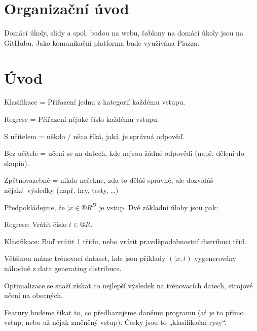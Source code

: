 \documentclass[12pt]{article}					%
\begin{document}

\section*{Organizační úvod}
	Domácí úkoly, slidy a spol. budou na webu, šablony na domácí úkoly jsou na GitHubu. Jako komunikační platforma bude využívána Piazza.
\section*{Úvod}

\begin{definice}
	Klasifikace = Přiřazení jednu z kategorií každému vstupu.

	Regrese = Přiřazení nějaké číslo každému vstupu.
\end{definice}

\begin{definice}
	S učitelem = někdo / něco říká, jaká je správná odpověď.

	Bez učitele = učení se na datech, kde nejsou žádné odpovědi (např. dělení do skupin).

	Zpětnovazebné = nikdo neřekne, zda to děláš správně, ale dozvídáš nějaké výsledky (např. hry, testy, …)
\end{definice}

\begin{poznamka}
	Předpokládejme, že $¦x \in ®R^D$ je vstup. Dvě základní úlohy jsou pak:

	Regrese: Vrátit číslo $t \in ®R$.

	Klasifikace: Buď vrátit 1 třídu, nebo vrátit pravděpodobnostní distribuci tříd.
\end{poznamka}

\begin{poznamka}
	Většinou máme trénovací dataset, kde jsou příklady $(¦x, t)$ vygenerovány náhodně z data generating distribuce.

	Optimalizace se snaží získat co nejlepší výsledek na trénovacích datech, strojové učení na obecných.
\end{poznamka}

\begin{definice}[Featury]
	Featury budeme říkat to, co předhazujeme danému programu (ať je to přímo vstup, nebo už nějak změněný vstup). Česky jsou to „klasifikační rysy“.
\end{definice}
\end{document}
